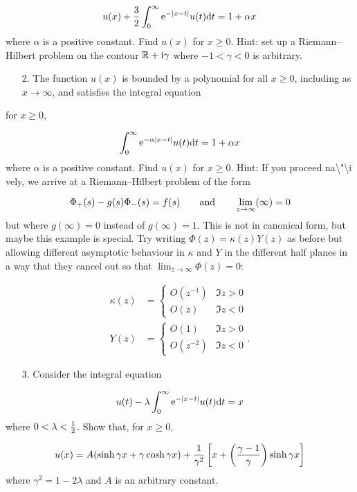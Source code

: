 \documentclass[12pt,a4paper]{article}
\def\qqand{\qquad\hbox{and}\qquad}
\def\D{ {\rm d} }
\def\I{ {\rm i} }
\def\E{ {\rm e} }
\def\R{ {\mathbb R} }
\def\dt{\D t}
\def\pr(#1){\left({#1}\right)}
\def\br[#1]{\left[{#1}\right]}
\def\endash{–}
\begin{document}
\[
      u(x) + {3 \over 2} \int_0^\infty \E^{-|x-t|} u(t)\dt = 1 + \alpha x
\]
where $\alpha$ is a positive constant. Find $u(x)$ for $x \geq 0$. Hint: set up  a Riemann\ensuremath{\endash}Hilbert problem on the contour $\R + \I \gamma$ where $-1 < \gamma < 0$ is arbitrary.

\begin{itemize}
\item[2. ] The function $u(x)$ is bounded by a polynomial for all $x \geq 0$, including as $x \rightarrow \infty$, and satisfies the integral equation

\end{itemize}
for $x \geq 0$,

\[
       \int_0^\infty \E^{-\alpha |x-t|} u(t)\dt = 1 + \alpha x
\]
where $\alpha$ is a positive constant. Find $u(x)$ for $x \geq 0$.  Hint: If you proceed na{\textbackslash}"{\textbackslash}i vely, we arrive at a Riemann\ensuremath{\endash}Hilbert problem of the form

\[
\Phi_+(s) -g(s) \Phi_-(s)  = f(s)     \qqand \lim_{z \rightarrow \infty} (\infty) = 0
\]
but where $g(\infty) = 0$ instead of $g(\infty) = 1$.  This is not in canonical form, but maybe this example is special. Try writing $\Phi(z) = \kappa(z) Y(z)$ as before but allowing different asymptotic behaviour in $\kappa$ and $Y$ in the different half planes in a way that they cancel out so that $\lim_{z \rightarrow \infty} \Phi(z) = 0$:


\begin{align*}
 \kappa(z) &=  \begin{cases} O(z^{-1}) & \Im z > 0 \\
                             O(z) &  \Im z < 0 \end{cases}  \\
Y(z) &=  \begin{cases}    O(1) & \Im z > 0 \\
                          O(z^{-2}) &  \Im z < 0 \end{cases}.
\end{align*}
\begin{itemize}
\item[3. ] Consider the integral equation

\end{itemize}
\[
       u(t) - \lambda \int_0^\infty \E^{-|x-t|} u(t)\dt =  x
\]
where $0 < \lambda < {1 \over 2}$. Show that, for $x \geq 0$,

\[
	u(x) = A(\sinh \gamma x + \gamma \cosh \gamma x) + {1 \over \gamma^2}\br[x + \pr(\gamma - {1 \over \gamma}) \sinh \gamma x]
\]
where $\gamma^2 = 1 - 2\lambda$ and $A$ is an arbitrary constant.
\end{document}
